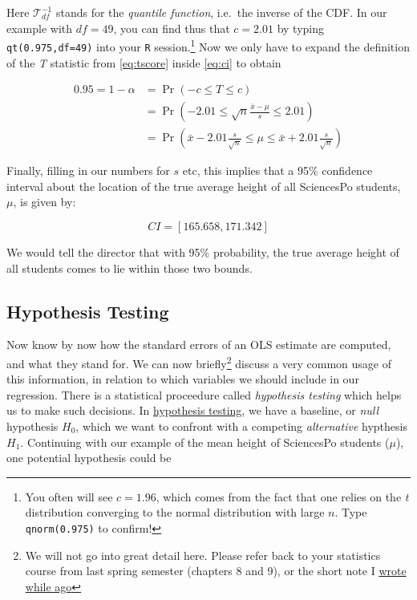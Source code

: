 \documentclass[]{book}
\let\rmarkdownfootnote\footnote%
\def\footnote{\protect\rmarkdownfootnote}
\begin{document}
Here \(\mathcal{T}_{df}^{-1}\) stands for the \emph{quantile function}, i.e.~the inverse of the CDF. In our example with \(df = 49\), you can find thus that \(c = 2.01\) by typing \texttt{qt(0.975,df=49)} into your \texttt{R} session.\footnote{You often will see \(c=1.96\), which comes from the fact that one relies on the \emph{t} distribution converging to the normal distribution with large \(n\). Type \texttt{qnorm(0.975)} to confirm!} Now we only have to expand the definition of the \emph{T} statistic from \eqref{eq:tscore} inside \eqref{eq:ci} to obtain

\begin{align}
0.95 = 1-\alpha &= \Pr \left(-c \leq T \leq c \right) \\\label{eq:ci2}
                &= \Pr \left(-2.01 \leq \sqrt{n} \frac{\bar{x} - \mu}{s} \leq 2.01 \right) \\
                 &= \Pr \left(\bar{x} -2.01 \frac{s}{\sqrt{n}} \leq \mu \leq \bar{x} + 2.01 \frac{s}{\sqrt{n}} \right) 
\end{align}

Finally, filling in our numbers for \(s\) etc, this implies that a 95\% confidence interval about the location of the true average height of all SciencesPo students, \(\mu\), is given by:

\begin{equation}
CI = \left[165.658 , 171.342 \right]
\end{equation}

We would tell the director that with 95\% probability, the true average height of all students comes to lie within those two bounds.

\hypertarget{hypothesis-testing}{%
\subsection{Hypothesis Testing}\label{hypothesis-testing}}

Now know by now how the standard errors of an OLS estimate are computed, and what they stand for. We can now briefly\footnote{We will not go into great detail here. Please refer back to your statistics course from last spring semester (chapters 8 and 9), or the short note I \href{images/hypothesis.pdf}{wrote while ago} } discuss a very common usage of this information, in relation to which variables we should include in our regression. There is a statistical proceedure called \emph{hypothesis testing} which helps us to make such decisions.
In \href{https://en.wikipedia.org/wiki/Statistical_hypothesis_testing}{hypothesis testing}, we have a baseline, or \emph{null} hypothesis \(H_0\), which we want to confront with a competing \emph{alternative} hypthesis \(H_1\). Continuing with our example of the mean height of SciencesPo students (\(\mu\)), one potential hypothesis could be
\end{document}
